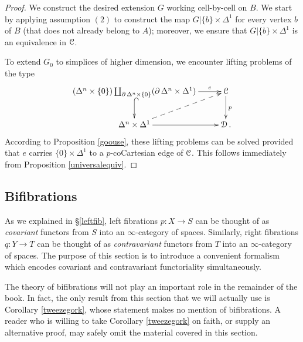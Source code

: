 \begin{proof}
We construct the desired extension $G$ working cell-by-cell on $B$. We start by applying assumption $(2)$ to construct the map $G| \{b\} \times \Delta^1$ for every vertex $b$ of $B$ (that does not already belong to $A$); moreover, we ensure that $G| \{b\} \times \Delta^1$ is an equivalence in $\operatorname{\mathcal{C}}$.

To extend $G_0$ to simplices of higher dimension, we encounter lifting problems of the type
$$ \xymatrix{ ( \Delta^n \times \{0\} ) \coprod_{ \bd \Delta^n \times \{0\} } ( \bd \Delta^n \times \Delta^1 ) \ar[r]^-{e} \ar@{^{(}->}[d] & \calC \ar[d]^{p} \\
\Delta^n \times \Delta^1 \ar[r] \ar@{-->}[ur] & \calD. }$$
According to Proposition \ref{goouse}, these lifting problems can be solved provided that
$e$ carries $\{ 0\} \times \Delta^1$ to a $p$-coCartesian edge of $\operatorname{\mathcal{C}}$. This follows immediately from Proposition \ref{universalequiv}.
\end{proof}

\subsection{Bifibrations}\label{bifib}

As we explained in \S \ref{leftfib}, left fibrations $p: X \rightarrow S$ can be thought of as {\em covariant} functors from $S$ into an $\infty$-category of spaces. Similarly, right fibrations $q: Y \rightarrow T$ can be thought of as {\em contravariant} functors from $T$ into an $\infty$-category of spaces. The purpose of this section is to introduce a convenient formalism which encodes covariant and contravariant functoriality simultaneously.

\begin{remark}
The theory of bifibrations will not play an important role in the remainder of the book. In fact, the only result from this section that we will actually use is Corollary \ref{tweezegork}, whose statement makes no mention of bifibrations. A reader who is willing to take Corollary \ref{tweezegork} on faith, or supply an alternative proof, may safely omit the material covered in this section.
\end{remark}


